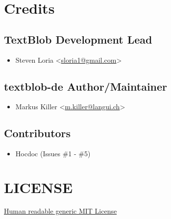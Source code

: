 \documentclass[letterpaper,10pt,english]{sphinxmanual}
\begin{document}
\section{Credits}
\label{authors:credits}\label{authors::doc}

\subsection{TextBlob Development Lead}
\label{authors:textblob-development-lead}\begin{itemize}
\item {} 
Steven Loria \textless{}\href{mailto:sloria1@gmail.com}{sloria1@gmail.com}\textgreater{}

\end{itemize}


\subsection{textblob-de Author/Maintainer}
\label{authors:textblob-de-author-maintainer}\begin{itemize}
\item {} 
Markus Killer \textless{}\href{mailto:m.killer@langui.ch}{m.killer@langui.ch}\textgreater{}

\end{itemize}


\subsection{Contributors}
\label{authors:contributors}\begin{itemize}
\item {} 
Hocdoc (Issues \#1 - \#5)

\end{itemize}


\section{LICENSE}
\label{license::doc}\label{license:license}\label{license:textblob-de}
\href{http://choosealicense.com/licenses/mit/}{Human readable generic MIT License}
\end{document}
